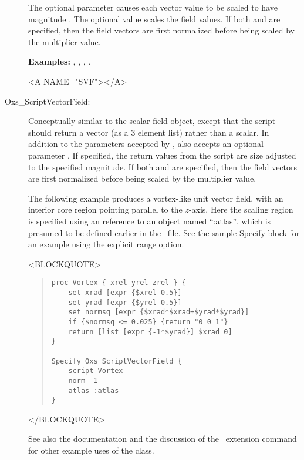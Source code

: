 \begin{description}
   The optional  parameter causes each vector value to be
   scaled to have magnitude .  The optional
    value scales the field values.  If both
    and  are specified, then the field vectors
   are first normalized before being scaled by the multiplier value.

\textbf{Examples:} , ,
, .

\begin{rawhtml}<A NAME="SVF"></A>\end{rawhtml}%
%
\item[Oxs\_ScriptVectorField:\label{item:ScriptVectorField}]
Conceptually similar to the
 scalar
field object,
except that the script should return a vector (as a 3 element list)
rather than a scalar.  In addition to the parameters accepted by
,  also accepts
an optional parameter .  If specified, the return
values from the script are size adjusted to the specified magnitude.
If both  and  are specified, then
the field vectors are first normalized before being scaled by the
multiplier value.

The following example produces a vortex-like unit vector field, with
an interior core region pointing parallel to the $z$-axis.  Here the
scaling region is specified using an  reference to an
object named ``:atlas'', which is presumed to be defined earlier in
the \MIF\ file.  See the  sample Specify
block for an example using the explicit range option.
\begin{rawhtml}<BLOCKQUOTE>\end{rawhtml}
\begin{quote}
\begin{verbatim}
proc Vortex { xrel yrel zrel } {
    set xrad [expr {$xrel-0.5}]
    set yrad [expr {$yrel-0.5}]
    set normsq [expr {$xrad*$xrad+$yrad*$yrad}]
    if {$normsq <= 0.025} {return "0 0 1"}
    return [list [expr {-1*$yrad}] $xrad 0]
}

Specify Oxs_ScriptVectorField {
    script Vortex
    norm  1
    atlas :atlas
}\end{verbatim}
\end{quote}
\begin{rawhtml}</BLOCKQUOTE>\end{rawhtml}
See also the
documentation and the discussion of the
 \MIF\ extension command
for other example uses of the  class.


\end{description}
